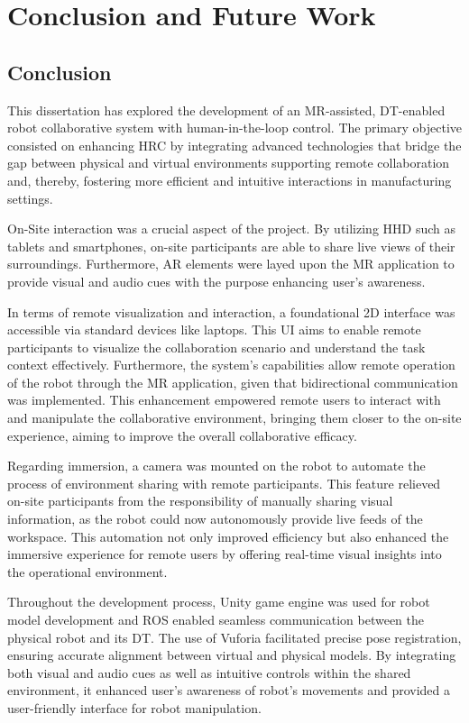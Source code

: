 \chapter{Conclusion and Future Work}%

\section{Conclusion}

This dissertation has explored the development of an \ac{MR}-assisted, \ac{DT}-enabled robot collaborative system with human-in-the-loop control. The primary objective consisted on enhancing \ac{HRC} by integrating advanced technologies that bridge the gap between physical and virtual environments supporting remote collaboration and, thereby, fostering more efficient and intuitive interactions in manufacturing settings.

On-Site interaction was a crucial aspect of the project. By utilizing \ac{HHD} such as tablets and smartphones, on-site participants are able to share live views of their surroundings. Furthermore, \ac{AR} elements were layed upon the \ac{MR} application to provide visual and audio cues with the purpose enhancing user's awareness. 

In terms of remote visualization and interaction, a foundational 2D interface was accessible via standard devices like laptops. This \ac{UI} aims to enable remote participants to visualize the collaboration scenario and understand the task context effectively. Furthermore, the system's capabilities allow remote operation of the robot through the \ac{MR} application, given that bidirectional communication was implemented. This enhancement empowered remote users to interact with and manipulate the collaborative environment, bringing them closer to the on-site experience, aiming to improve the overall collaborative efficacy.


Regarding immersion, a camera was mounted on the robot to automate the process of environment sharing with remote participants. This feature relieved on-site participants from the responsibility of manually sharing visual information, as the robot could now autonomously provide live feeds of the workspace. This automation not only improved efficiency but also enhanced the immersive experience for remote users by offering real-time visual insights into the operational environment.

Throughout the development process, Unity game engine was used for robot model development and \ac{ROS} enabled seamless communication between the physical robot and its \ac{DT}. The use of Vuforia facilitated precise pose registration, ensuring accurate alignment between virtual and physical models. By integrating both visual and audio cues as well as intuitive controls within the shared environment, it enhanced user's awareness of robot's movements and provided a user-friendly interface for robot manipulation.


